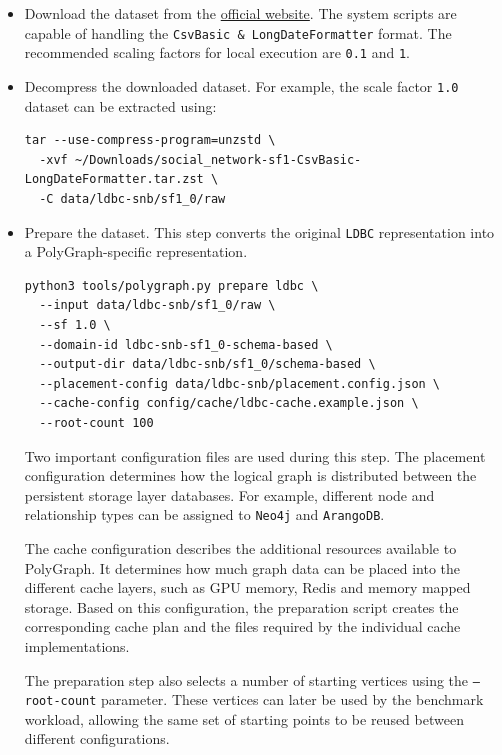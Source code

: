 \documentclass[11pt,a4paper]{article}
\begin{document}
\begin{itemize}
    \item Download the dataset from the
    \href{https://ldbcouncil.org/benchmarks/snb/datasets/}{official website}.
    The system scripts are capable of handling the
    \texttt{CsvBasic \& LongDateFormatter} format. The recommended scaling
    factors for local execution are \texttt{0.1} and \texttt{1}.

    \item Decompress the downloaded dataset. For example, the scale factor
    \texttt{1.0} dataset can be extracted using:

\begin{lstlisting}[style=bash]
tar --use-compress-program=unzstd \
  -xvf ~/Downloads/social_network-sf1-CsvBasic-LongDateFormatter.tar.zst \
  -C data/ldbc-snb/sf1_0/raw
\end{lstlisting}

    \item Prepare the dataset. This step converts the original \texttt{LDBC}
    representation into a PolyGraph-specific representation.

\begin{lstlisting}[style=bash]
python3 tools/polygraph.py prepare ldbc \
  --input data/ldbc-snb/sf1_0/raw \
  --sf 1.0 \
  --domain-id ldbc-snb-sf1_0-schema-based \
  --output-dir data/ldbc-snb/sf1_0/schema-based \
  --placement-config data/ldbc-snb/placement.config.json \
  --cache-config config/cache/ldbc-cache.example.json \
  --root-count 100
\end{lstlisting}

    Two important configuration files are used during this step. The placement
    configuration determines how the logical graph is distributed between the
    persistent storage layer databases. For example, different node and
    relationship types can be assigned to \texttt{Neo4j} and
    \texttt{ArangoDB}.

    The cache configuration describes the additional resources available to
    PolyGraph. It determines how much graph data can be placed into the
    different cache layers, such as GPU memory, Redis and memory mapped
    storage. Based on this configuration, the preparation script creates the
    corresponding cache plan and the files required by the individual cache
    implementations.

    The preparation step also selects a number of starting vertices using the
    \texttt{--root-count} parameter. These vertices can later be used by the
    benchmark workload, allowing the same set of starting points to be reused
    between different configurations.


\end{itemize}
\end{document}
